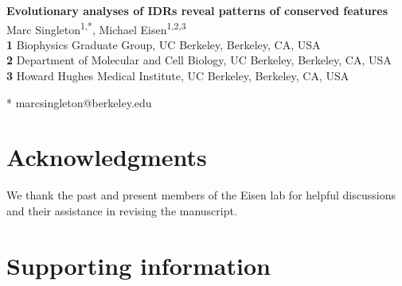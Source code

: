 \documentclass[11pt,letterpaper]{article}
\begin{document}
\begin{flushleft}
{\Large\textbf{Evolutionary analyses of IDRs reveal patterns of conserved features}}
\\
\bigskip
Marc Singleton\textsuperscript{1,*},
Michael Eisen\textsuperscript{1,2,3}
\\
\bigskip
\textbf{1} Biophysics Graduate Group, UC Berkeley, Berkeley, CA, USA
\\
\textbf{2} Department of Molecular and Cell Biology, UC Berkeley, Berkeley, CA, USA
\\
\textbf{3} Howard Hughes Medical Institute, UC Berkeley, Berkeley, CA, USA
\\
\bigskip

* marcsingleton@berkeley.edu

\end{flushleft}

\graphicspath{{figures/}}


\section{Acknowledgments}
We thank the past and present members of the Eisen lab for helpful discussions and their assistance in revising the manuscript.

\printbibliography

\clearpage

\setcounter{figure}{0}
\renewcommand{\thefigure}{S\arabic{figure}}
\setcounter{table}{0}
\renewcommand{\thetable}{S\arabic{table}}

\section*{Supporting information}

\end{document}
